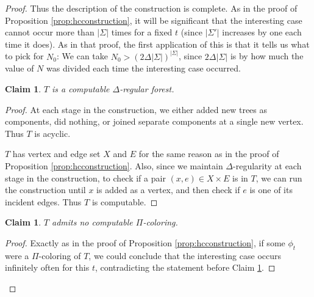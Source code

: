 \documentclass[10pt,a4paper]{amsart}
\newtheorem{claim}[theorem]{Claim}
\theoremstyle{definition}
\begin{document}
\begin{proof}
Thus the description of the construction is complete. As in the proof of Proposition \ref{prop:hcconstruction}, it will be significant that the interesting case cannot occur more than $|\Sigma|$ times for a fixed $t$ (since $|\Sigma'|$ increases by one each time it does). As in that proof, the first application of this is that it tells us what to pick for $N_0$: We can take $N_0 > (2\Delta |\Sigma|)^{|\Sigma|}$, since $2\Delta|\Sigma|$ is by how much the value of $N$ was divided each time the interesting case occurred. 

\begin{claim}\label{claim:Tcomp2}
$T$ is a computable $\Delta$-regular forest.
\end{claim}

\begin{proof}
    At each stage in the construction, we either added new trees as components, did nothing, or joined separate components at a single new vertex. Thus $T$ is acyclic.
    
    $T$ has vertex and edge set $X$ and $E$ for the same reason as in the proof of Proposition \ref{prop:hcconstruction}. Also, since we maintain $\Delta$-regularity at each stage in the construction, to check if a pair $(x,e) \in X \times E$ is in $T$, we can run the construction until $x$ is added as a vertex, and then check if $e$ is one of its incident edges. Thus $T$ is computable.
\end{proof}

\begin{claim}
$T$ admits no computable $\Pi$-coloring.
\end{claim}

\begin{proof}
    Exactly as in the proof of Proposition \ref{prop:hcconstruction}, if some $\phi_t$ were a $\Pi$-coloring of $T$, we could conclude that the interesting case occurs infinitely often for this $t$, contradicting the statement before Claim \ref{claim:Tcomp2}.
\end{proof}

\end{proof}



\end{document}
